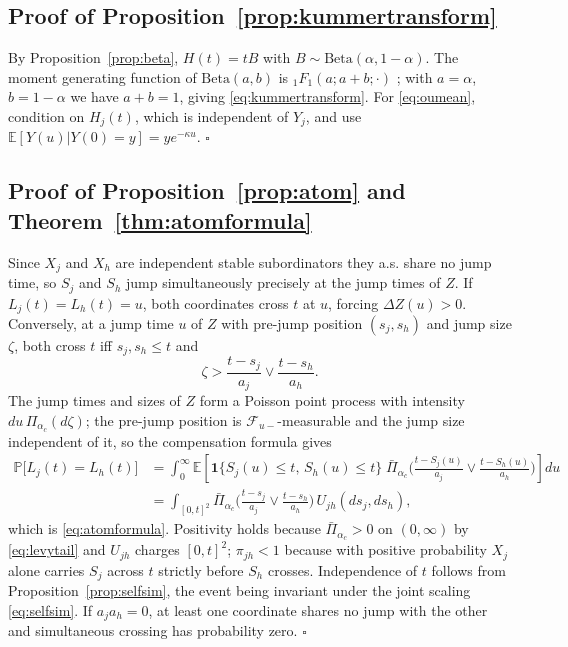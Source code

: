 \documentclass{ws-ijtaf}
\newcommand{\E}{\mathbb{E}}
\newcommand{\PP}{\mathbb{P}}
\newcommand{\Bet}{\mathrm{Beta}}
\newcommand{\ind}{\mathbf{1}}
\newcommand{\Fone}{{}_1F_1}
\providecommand{\qed}{\hfill\ensuremath{\square}}
\begin{document}
\subsection*{Proof of Proposition~\ref{prop:kummertransform}}

By Proposition~\ref{prop:beta}, $H(t)=tB$ with $B\sim\Bet(\alpha,1-\alpha)$. The
moment generating function of $\Bet(a,b)$ is $\Fone(a;a+b;\cdot)$
\citep[Sec.~13]{nist10}; with $a=\alpha$, $b=1-\alpha$ we have $a+b=1$, giving
\eqref{eq:kummertransform}. For \eqref{eq:oumean}, condition on $H_j(t)$, which
is independent of $Y_j$, and use $\E[Y(u)|Y(0)=y]=ye^{-\kappa u}$. \qed

\subsection*{Proof of Proposition~\ref{prop:atom} and
Theorem~\ref{thm:atomformula}}

Since $X_j$ and $X_h$ are independent stable subordinators they a.s. share no
jump time, so $S_j$ and $S_h$ jump simultaneously precisely at the jump times of
$Z$. If $L_j(t)=L_h(t)=u$, both coordinates cross $t$ at $u$, forcing
$\Delta Z(u)>0$. Conversely, at a jump time $u$ of $Z$ with pre-jump position
$(s_j,s_h)$ and jump size $\zeta$, both cross $t$ iff $s_j,s_h\le t$ and
\begin{equation}
\zeta > \frac{t-s_j}{a_j} \vee \frac{t-s_h}{a_h}.
\end{equation}
The jump times and sizes of $Z$ form a Poisson point process with intensity
$du\,\Pi_{\alpha_c}(d\zeta)$; the pre-jump position is
$\mathcal{F}_{u-}$-measurable and the jump size independent of it, so the
compensation formula gives
\begin{align}
\PP\big[L_j(t)=L_h(t)\big]
&= \int_0^\infty \E\left[\ind\{S_j(u)\le t,\, S_h(u)\le t\}\;
   \bar\Pi_{\alpha_c}\!\Big(\tfrac{t-S_j(u)}{a_j}\vee
   \tfrac{t-S_h(u)}{a_h}\Big)\right] du \nonumber\\
&= \int_{[0,t]^2}
   \bar\Pi_{\alpha_c}\!\Big(\tfrac{t-s_j}{a_j}\vee\tfrac{t-s_h}{a_h}\Big)\,
   U_{jh}(ds_j,ds_h),
\end{align}
which is \eqref{eq:atomformula}. Positivity holds because
$\bar\Pi_{\alpha_c}>0$ on $(0,\infty)$ by \eqref{eq:levytail} and $U_{jh}$
charges $[0,t]^2$; $\pi_{jh}<1$ because with positive probability $X_j$ alone
carries $S_j$ across $t$ strictly before $S_h$ crosses. Independence of $t$
follows from Proposition~\ref{prop:selfsim}, the event being invariant under the
joint scaling \eqref{eq:selfsim}. If $a_ja_h=0$, at least one coordinate shares
no jump with the other and simultaneous crossing has probability zero. \qed
\end{document}
